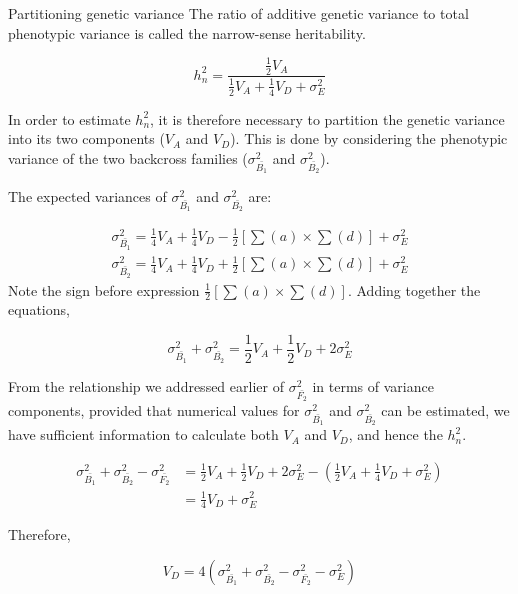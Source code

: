 \documentclass[11pt,dvipsnames,ignorenonframetext,aspectratio=169]{beamer}
\begin{document}
\begin{frame}{Partitioning genetic variance}
\protect\hypertarget{partitioning-genetic-variance}{}
The ratio of additive genetic variance to total phenotypic variance is
called the narrow-sense heritability.

\[
h_n^2 = \frac{\frac{1}{2}V_A}{\frac{1}{2}V_A + \frac{1}{4}V_D + \sigma_E^2}
\tag{v}
\]

In order to estimate \(h_n^2\), it is therefore necessary to partition
the genetic variance into its two components (\(V_A\) and \(V_D\)). This
is done by considering the phenotypic variance of the two backcross
families (\(\sigma_{\bar{B_1}}^2\) and \(\sigma_{\bar{B_2}}^2\)).
\end{frame}

\begin{frame}{}
\protect\hypertarget{section-18}{}
The expected variances of \(\sigma_{\bar{B_1}}^2\) and
\(\sigma_{\bar{B_2}}^2\) are:

\[
\begin{aligned}
\sigma_{\bar{B_1}}^2 = \frac{1}{4}V_A + \frac{1}{4}V_D - \frac{1}{2}\left[\sum(a)\times\sum(d)\right] + \sigma_E^2 \\
\sigma_{\bar{B_2}}^2 = \frac{1}{4}V_A + \frac{1}{4}V_D + \frac{1}{2}\left[\sum(a)\times\sum(d)\right] + \sigma_E^2
\end{aligned}
\] Note the sign before expression
\(\frac{1}{2}\left[\sum(a)\times\sum(d)\right]\). Adding together the
equations,

\[
\sigma_{\bar{B_1}}^2 + \sigma_{\bar{B_2}}^2 = \frac{1}{2}V_A + \frac{1}{2}V_D + 2\sigma_E^2
\tag{vi}
\]
\end{frame}

\begin{frame}{}
\protect\hypertarget{section-19}{}
From the relationship we addressed earlier of \(\sigma_{\bar{F_2}}^2\)
in terms of variance components, provided that numerical values for
\(\sigma_{\bar{B_1}}^2\) and \(\sigma_{\bar{B_2}}^2\) can be estimated,
we have sufficient information to calculate both \(V_A\) and \(V_D\),
and hence the \(h_n^2\).

\[
\begin{aligned}
\sigma_{\bar{B_1}}^2 + \sigma_{\bar{B_2}}^2 - \sigma_{\bar{F_2}}^2 &= \frac{1}{2}V_A + \frac{1}{2}V_D + 2\sigma_E^2 - \left(\frac{1}{2}V_A + \frac{1}{4}V_D + \sigma_E^2\right) \\
&= \frac{1}{4}V_D + \sigma_E^2
\end{aligned}
\]

Therefore,

\[
V_D = 4\left(\sigma_{\bar{B_1}}^2 + \sigma_{\bar{B_2}}^2 - \sigma_{\bar{F_2}}^2 - \sigma_E^2 \right)
\tag{vii}
\]
\end{frame}
\end{document}
